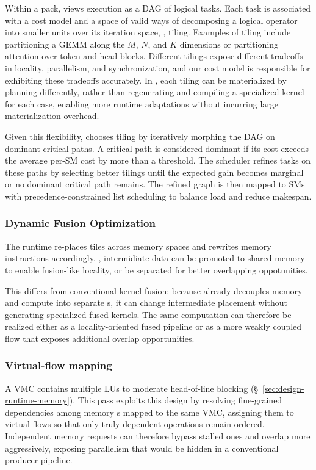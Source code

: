 Within a pack, \sys{} views execution as a DAG of logical tasks. Each task is associated with a cost model and a space of valid ways of decomposing a logical operator into smaller units over its iteration space, \ie, tiling.
Examples of tiling include partitioning a GEMM along the $M$, $N$, and $K$ dimensions or partitioning attention over token and head blocks.
Different tilings expose different tradeoffs in locality, parallelism, and synchronization,
and our cost model is responsible for exhibiting these tradeoffs accurately. In \sys{}, each tiling can be materialized by planning \mop{} differently, rather than regenerating and compiling a specialized kernel for each case, enabling more runtime adaptations without incurring large materialization overhead.

Given this flexibility, \sys{} chooses tiling by iteratively morphing the DAG on dominant critical paths. A critical path is considered dominant if its cost exceeds the average per-SM cost by more than a threshold. The scheduler refines tasks on these paths by selecting better tilings until the expected gain becomes marginal or no dominant critical path remains. The refined graph is then mapped to SMs with precedence-constrained list scheduling to balance load and reduce makespan.

\subsubsection{Dynamic Fusion Optimization}
The runtime re-places tiles across memory spaces and rewrites memory instructions accordingly.
\eg, intermidiate data can be promoted to shared memory to enable fusion-like locality,
or be separated for better overlapping oppotunities. %

This differs from conventional kernel fusion: because \sys{} already decouples memory and compute into separate \mop{}s, it can change intermediate placement without generating specialized fused kernels. The same computation can therefore be realized either as a locality-oriented fused pipeline or as a more weakly coupled flow that exposes additional overlap opportunities.


\subsubsection{Virtual-flow mapping} 
A VMC contains multiple LUs to moderate head-of-line blocking (\S~\ref{sec:design-runtime-memory}). This pass exploits this design by resolving fine-grained dependencies among memory \mop{}s mapped to the same VMC, assigning them to virtual flows so that only truly dependent operations remain ordered. Independent memory requests can therefore bypass stalled ones and overlap more aggressively, exposing parallelism that would be hidden in a conventional producer pipeline.

